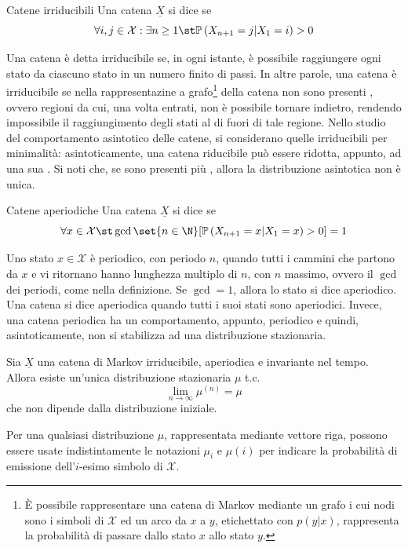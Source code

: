 \begin{definition}{Catene irriducibili}
  Una catena \(\underline{X}\) si dice  se
  \[\forall i,j \in \mathcal{X}: \exists n \geq 1 \st \Prob[X_{n+1} = j|X_1 = i] > 0\]
\end{definition}

Una catena è detta irriducibile se, in ogni istante, è possibile raggiungere ogni stato da ciascuno stato in un numero finito di passi. In altre parole, una catena è irriducibile se nella rappresentazine a grafo\footnote{È possibile rappresentare una catena di Markov mediante un grafo i cui nodi sono i simboli di $\mathcal{X}$ ed un arco da $x$ a $y$, etichettato con $p(y|x)$, rappresenta la probabilità di passare dallo stato $x$ allo stato $y$.} della catena non sono presenti , ovvero regioni da cui, una volta entrati, non è possibile tornare indietro, rendendo impossibile il raggiungimento degli stati al di fuori di tale regione. 
Nello studio del comportamento asintotico delle catene, si considerano quelle irriducibili per minimalità: asintoticamente, una catena riducibile può essere ridotta, appunto, ad una sua . Si noti che, se sono presenti più , allora la distribuzione asintotica non è unica. 

\begin{definition}{Catene aperiodiche}
  Una catena \(\underline{X}\) si dice  se
  \[\forall x \in \mathcal{X} \st \gcd \set{n\in\N}[\Prob[X_{n+1} = x|X_1=x]>0] = 1\]
\end{definition}

Uno stato $x \in \mathcal{X}$ è periodico, con periodo $n$, quando tutti i cammini che partono da $x$ e vi ritornano hanno lunghezza multiplo di $n$, con $n$ massimo, ovvero il $\gcd$ dei periodi, come nella definizione. Se $\gcd=1$, allora lo stato si dice aperiodico. Una catena si dice aperiodica quando tutti i suoi stati sono aperiodici. Invece, una catena periodica ha un comportamento, appunto, periodico e quindi, asintoticamente, non si stabilizza ad una distribuzione stazionaria.

\begin{theorem}{}
  Sia $\underline{X}$ una catena di Markov irriducibile, aperiodica e invariante nel tempo. Allora esiste un'unica distribuzione stazionaria $\mu$ t.c. 
  \[\lim_{n\to\infty} \mu^{(n)} = \mu\]
  che non dipende dalla distribuzione iniziale.
\end{theorem}

\begin{note}{}
  Per una qualsiasi distribuzione $\mu$, rappresentata mediante vettore riga, possono essere usate indistintamente le notazioni $\mu_i$ e $\mu(i)$ per indicare la probabilità di emissione dell'$i$-esimo simbolo di $\mathcal{X}$.
\end{note}

